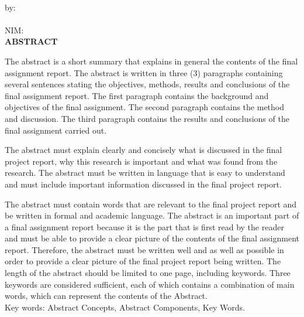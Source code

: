
\clearpage
{}
{}
\begin{center}
    \textbf{\large{\judulen}}\\[0.5cm]
    by:\\
    \penulis\\
    NIM: \nim\\[2em]
    \textbf{ABSTRACT}\\[0.5cm]
\end{center}

The abstract is a short summary that explains in general the contents of the final assignment report. The abstract is written in three (3) paragraphs containing several sentences stating the objectives, methods, results and conclusions of the final assignment report. The first paragraph contains the background and objectives of the final assignment. The second paragraph contains the method and discussion. The third paragraph contains the results and conclusions of the final assignment carried out.

The abstract must explain clearly and concisely what is discussed in the final project report, why this research is important and what was found from the research. The abstract must be written in language that is easy to understand and must include important information discussed in the final project report.

The abstract must contain words that are relevant to the final project report and be written in formal and academic language. The abstract is an important part of a final assignment report because it is the part that is first read by the reader and must be able to provide a clear picture of the contents of the final assignment report. Therefore, the abstract must be written well and as well as possible in order to provide a clear picture of the final project report being written. The length of the abstract should be limited to one page, including keywords. Three keywords are considered sufficient, each of which contains a combination of main words, which can represent the contents of the Abstract.\\[0.6cm]

\noindent Key words: Abstract Concepts, Abstract Components, Key Words.
